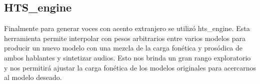 \enganchar


\subsection{HTS\_engine}

Finalmente para generar voces con acento extranjero se utilizó hts\_engine. Esta herramienta permite interpolar con pesos arbitrarios entre varios modelos para producir un nuevo modelo con una mezcla de la carga fonética y prosódica de ambos hablantes y sintetizar audios. Esto nos brinda un gran rango exploratorio y nos permitirá ajustar la carga fonética de los modelos originales para acercarnos al modelo deseado. 

